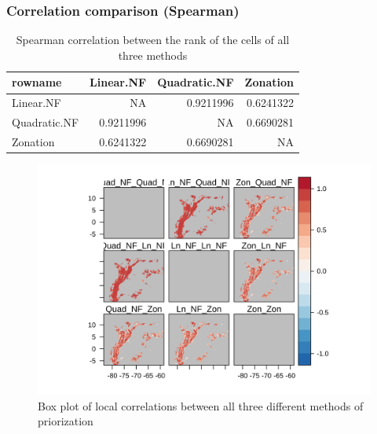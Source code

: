 \documentclass[]{article}
\begin{document}
\hypertarget{correlation-comparison-spearman}{%
\subsubsection{Correlation comparison (Spearman)}\label{correlation-comparison-spearman}}

\begin{table}

\caption{\label{tab:Corr}Spearman correlation between the rank of the cells of all three methods}
\centering
\begin{tabular}[t]{lrrr}
\toprule
rowname & Linear.NF & Quadratic.NF & Zonation\\
\midrule
Linear.NF & NA & 0.9211996 & 0.6241322\\
Quadratic.NF & 0.9211996 & NA & 0.6690281\\
Zonation & 0.6241322 & 0.6690281 & NA\\
\bottomrule
\end{tabular}
\end{table}

\begin{figure}
\centering
\includegraphics{NFPaper_files/figure-latex/LocalCorr-1.png}
\caption{\label{fig:LocalCorr}Box plot of local correlations between all three different methods of priorization}
\end{figure}
\end{document}
